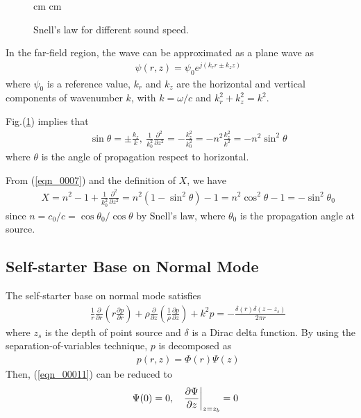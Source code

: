 \documentclass[journal,onecolumn]{IEEEtran}
\begin{document}
\begin{figure}[h]
 cm
 cm
\caption{Snell's law for different sound speed.}
\label{Fig_pic1}
\end{figure}

In the far-field region, the wave can be approximated as a plane wave as \cite{COA}
\begin{eqnarray}
&&\psi (r, z) = \psi_0 e^{j(k_r r \pm k_z z)} 
\label{eqn_0020}
\end{eqnarray}
where $\psi_0$ is a reference value, $k_r$ and $k_z$ are the horizontal and vertical components of wavenumber 
$k$, with $k = \omega / c$ and $k_r^2 + k_z^2 = k^2$.

Fig.(\ref{Fig_pic1}) implies that
\begin{eqnarray}
&&\sin \theta = \pm \frac{k_z}{k}, \ \frac{1}{k_0^2} \frac{\partial^2}{\partial z^2} 
= -\frac{k_z^2}{k_0^2} =  - n^2 \frac{k_z^2}{k^2} = - n^2 \sin^2 \theta
\label{eqn_0021} 
\end{eqnarray}
where $\theta$ is the angle of propagation respect to horizontal.

From (\ref{eqn_0007}) and the definition of $X$, we have
\begin{eqnarray}
&&X =  n^2 - 1 + \frac{1}{k_0^2} \frac{\partial^2}{\partial z^2} 
= n^2 ( 1 - \sin^2 \theta ) - 1 = n^2 \cos^2 \theta - 1 = - \sin^2 \theta_0
\label{eqn_0022}
\end{eqnarray}
since $n = c_0 / c = \cos \theta_0 / \cos \theta$ by Snell's law, where $\theta_0$ is the propagation angle at source. 

\subsection{Self-starter Base on Normal Mode}

The self-starter base on normal mode satisfies \cite{COA}
\begin{eqnarray}
&&\frac{1}{r} \frac{\partial }{\partial r} \left(r \frac{\partial p}{\partial r} \right) 
+ \rho \frac{\partial }{\partial z} \left( \frac{1}{\rho} \frac{\partial p}{\partial z} \right) 
+ k^2  p = - \frac{\delta (r) \delta(z - z_s)}{2 \pi r}
\label{SS_0001}
\end{eqnarray}
where $z_s$ is the depth of point source and $\delta$ is a Dirac delta function.
By using the separation-of-variables technique, $p$ is decomposed as
\begin{eqnarray}
&&p(r, z) = \Phi(r) \Psi(z) 
\label{SS_0002} 
\end{eqnarray}
Then, (\ref{eqn_00011}) can be reduced to
\begin{eqnarray}
&&\Psi(0) = 0, \hspace{0.3 cm} \left. \frac{\partial \Psi}{\partial z} \right|_{z = z_b} = 0
\label{SS_0003}  
\end{eqnarray}
\end{document}
